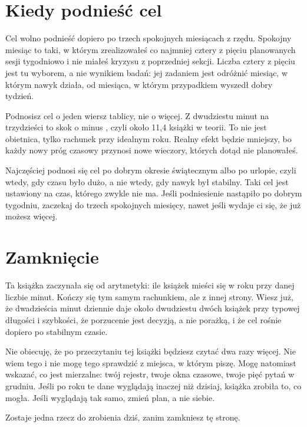 \section{Kiedy podnieść cel}

Cel wolno podnieść dopiero po trzech spokojnych miesiącach z rzędu. Spokojny miesiąc to taki, w którym zrealizowałeś co najmniej cztery z pięciu planowanych sesji tygodniowo i nie miałeś kryzysu z poprzedniej sekcji. Liczba cztery z pięciu jest tu wyborem, a nie wynikiem badań: jej zadaniem jest odróżnić miesiąc, w którym nawyk działa, od miesiąca, w którym przypadkiem wyszedł dobry tydzień.

Podnosisz cel o jeden wiersz tablicy, nie o więcej. Z dwudziestu minut na trzydzieści to skok o  minus , czyli około 11,4 książki w teorii. To nie jest obietnica, tylko rachunek przy idealnym roku. Realny efekt będzie mniejszy, bo każdy nowy próg czasowy przynosi nowe wieczory, których dotąd nie planowałeś.

\begin{falle}[Pułapka]
Najczęściej podnosi się cel po dobrym okresie świątecznym albo po urlopie, czyli wtedy, gdy czasu było dużo, a nie wtedy, gdy nawyk był stabilny. Taki cel jest ustawiony na czas, którego zwykle nie ma. Jeśli podniesienie nastąpiło po dobrym tygodniu, zaczekaj do trzech spokojnych miesięcy, nawet jeśli wydaje ci się, że już możesz więcej.
\end{falle}

\section{Zamknięcie}

Ta książka zaczynała się od arytmetyki: ile książek mieści się w roku przy danej liczbie minut. Kończy się tym samym rachunkiem, ale z innej strony. Wiesz już, że dwadzieścia minut dziennie daje około dwudziestu dwóch książek przy typowej długości i szybkości, że porzucenie jest decyzją, a nie porażką, i że cel rośnie dopiero po stabilnym czasie.

Nie obiecuję, że po przeczytaniu tej książki będziesz czytać dwa razy więcej. Nie wiem tego i nie mogę tego sprawdzić z miejsca, w którym piszę. Mogę natomiast wskazać, co jest mierzalne: twój rejestr, twoje okna czasowe, twoje pięć pytań w grudniu. Jeśli po roku te dane wyglądają inaczej niż dzisiaj, książka zrobiła to, co mogła. Jeśli wyglądają tak samo, zmień plan, a nie siebie.

Zostaje jedna rzecz do zrobienia dziś, zanim zamkniesz tę stronę.

